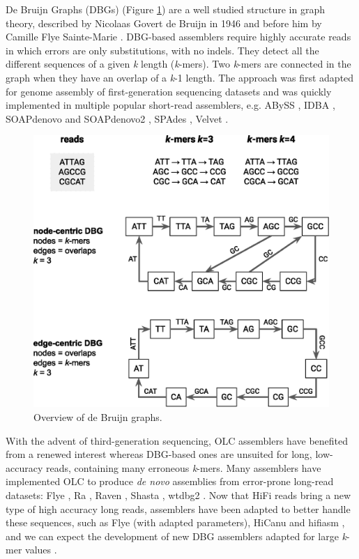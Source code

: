De Bruijn Graphs (DBGs) (Figure \ref{fig:dbg}) are a well studied structure in graph theory, described by Nicolaas Govert de Bruijn in 1946 \cite{dbg} and before him by Camille Flye Sainte-Marie \cite{flyesaintemarie}. DBG-based assemblers require highly accurate reads in which errors are only substitutions, with no indels. They detect all the different sequences of a given \textit{k} length (\textit{k}-mers). Two \textit{k}-mers are connected in the graph when they have an overlap of a \textit{k}-1 length. The approach was first adapted for genome assembly of first-generation sequencing datasets \cite{Compeau2011} and was quickly implemented in multiple popular short-read assemblers, e.g. ABySS \cite{abyss, abyss2}, IDBA \cite{idba}, SOAPdenovo \cite{soapdenovo} and SOAPdenovo2 \cite{soapdenovo2}, SPAdes \cite{spades}, Velvet \cite{velvet}. \\

\begin{figure}
    \centering
    \includegraphics[width=\textwidth]{fig/review_de_bruijn_graph.eps}
    \caption{Overview of de Bruijn graphs.}
    \label{fig:dbg}
\end{figure}


With the advent of third-generation sequencing, OLC assemblers have benefited from a renewed interest whereas DBG-based ones are unsuited for long, low-accuracy reads, containing many erroneous \textit{k}-mers. Many assemblers have implemented OLC to produce \textit{de novo} assemblies from error-prone long-read datasets: Flye \cite{flye}, Ra \cite{ra}, Raven \cite{raven}, Shasta \cite{shasta}, wtdbg2 \cite{wtdbg2}. Now that HiFi reads bring a new type of high accuracy long reads, assemblers have been adapted to better handle these sequences, such as Flye (with adapted parameters), HiCanu \cite{hicanu} and hifiasm \cite{hifiasm}, and we can expect the development of new DBG assemblers adapted for large \textit{k}-mer values \cite{bankevich2020}. \\

